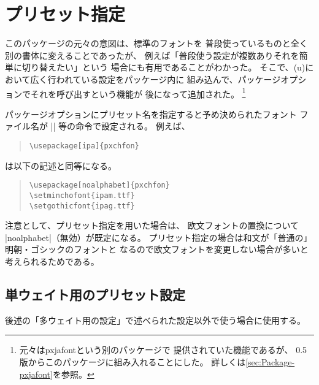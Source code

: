 \documentclass[uplatex,dvipdfmx,a4paper]{jsarticle}
\newcommand{\Pkg}[1]{\textsf{#1}}
\begin{document}
\section{プリセット指定}
\label{sec:Preset}

このパッケージの元々の意図は、標準のフォントを
普段使っているものと全く別の書体に変えることであったが、
例えば「普段使う設定が複数ありそれを簡単に切り替えたい」という
場合にも有用であることがわかった。
そこで、{(u)\pLaTeX}において広く行われている設定をパッケージ内に
組み込んで、パッケージオプションでそれを呼び出すという機能が
後になって追加された。
\footnote{元々は\Pkg{pxjafont}という別のパッケージで
提供されていた機能であるが、
0.5版からこのパッケージに組み入れることにした。
詳しくは\ref{sec:Package-pxjafont}を参照。}

パッケージオプションにプリセット名を指定すると予め決められたフォント
ファイル名が |\setminchofont| 等の命令で設定される。
例えば、
\begin{quote}\small\begin{verbatim}
\usepackage[ipa]{pxchfon}
\end{verbatim}\end{quote}
は以下の記述と同等になる。
\begin{quote}\small\begin{verbatim}
\usepackage[noalphabet]{pxchfon}
\setminchofont{ipam.ttf}
\setgothicfont{ipag.ttf}
\end{verbatim}\end{quote}

注意として、プリセット指定を用いた場合は、
欧文フォントの置換について |noalphabet|（無効）が既定になる。
プリセット指定の場合は和文が「普通の」明朝・ゴシックのフォントと
なるので欧文フォントを変更しない場合が多いと考えられるためである。

\subsection{単ウェイト用のプリセット設定}

後述の「多ウェイト用の設定」で述べられた設定以外で使う場合に使用する。
\end{document}
